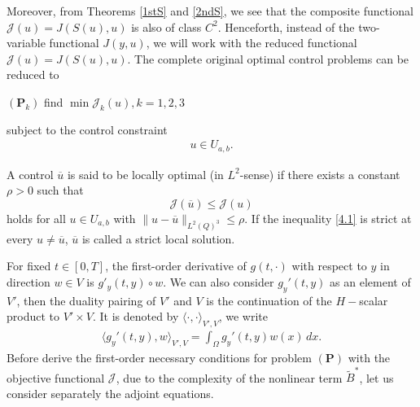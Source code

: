 \documentclass[reqno]{amsart}
\begin{document}
	Moreover, from Theorems \ref{1stS} and \ref{2ndS}, we see that the composite functional $\mathcal{J}(u)=J(S(u),u)$ is also of class $C^2$. Henceforth, instead of the two-variable functional $J(y,u)$, we will work with the reduced functional $\mathcal{J}(u)=J(S(u),u)$. The complete original optimal control problems can be reduced to
	\begin{center}
		$(\textbf{P}_k)$ \hspace{8pt} find $\min \mathcal{J}_k(u), k=1,2,3$ 
	\end{center}
	subject to the control constraint
	\begin{align*}
		u \in U_{a,b}.
	\end{align*}
	\begin{definition}\label{def4.1}
		A control $\overline{u}$ is said to be locally optimal (in $L^2$-sense) if there exists a constant $\rho >0$ such that
		\begin{equation} \label{4.1}
			\mathcal{J}(\overline{u})\leq \mathcal{J}(u)
		\end{equation}
		holds for all $u \in U_{a,b}$ with $\|u-\overline{u}\|_{L^2(Q)^3}\leq \rho$. If the inequality \eqref{4.1} is strict at every $u\ne \overline{u}$, $\overline{u}$ is called a strict local solution.
	\end{definition}
	
	For fixed $t\in [0,T]$, the first-order derivative of $g(t,\cdot)$ with respect to $y$ in direction $w \in V$ is $g'_y(t,y) \circ w$. We can also consider $g_y'(t, y)$ as an element of $V'$, then the duality pairing of $V'$ and $V$ is the continuation of the $H-$scalar product to $V' \times V$. It is denoted by $\langle\cdot,\cdot\rangle_{V',V}$, we write
	\begin{align*}
		\langle g_y'(t,y), w \rangle_{V',V}=\int_{\Omega}g_y'(t,y)w(x)\,dx.
	\end{align*}
	Before derive the first-order necessary conditions for problem $(\textbf{P})$ with the objective functional $\mathcal{J}$, due to the complexity of the nonlinear term $\widetilde{B}^*$, let us consider separately the adjoint equations.
	
\end{document}
